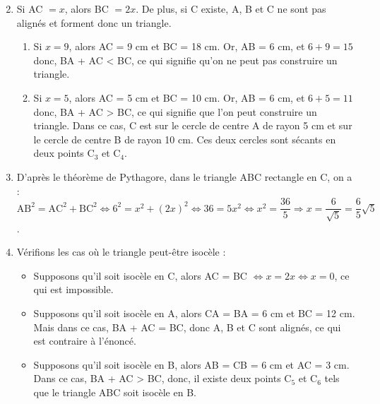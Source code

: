 \begin{enumerate}
\setcounter{enumi}{1}
      \item Si AC $=x$, alors BC $=2x$. De plus, si C existe, A, B et C ne sont pas alignés et forment donc un triangle. \\
      \begin{enumerate}
         \item Si $x=9$, alors AC = 9 cm et BC = 18 cm. Or, AB = 6 cm, et $6+9 =15$ donc, BA + AC < BC, ce qui signifie qu'on ne peut pas construire un triangle. 
         \item Si $x=5$, alors AC = 5 cm et BC = 10 cm. Or, AB = 6 cm, et $6+5 =11$ donc, BA + AC > BC, ce qui signifie que l'on peut construire un triangle. Dans ce cas, C est sur le cercle de centre A de rayon 5 cm et sur le cercle de centre B de rayon 10  cm. Ces deux cercles sont sécants en deux points C$_3$ et C$_4$. \\
      \end{enumerate}
      \item D'après le théorème de Pythagore, dans le triangle ABC rectangle en C, on a : \\
      $\text{AB}^2 =\text{AC}^2+\text{BC}^2 \iff 6^2 =x^2+(2x)^2 \iff 36 =5x^2 \iff x^2 =\dfrac{36}{5} \Longrightarrow x=\dfrac{6}{\sqrt5} =\dfrac{6}{5}\sqrt5$. \\
       \item Vérifions les cas où le triangle peut-être isocèle :
          \begin{itemize}
            \item Supposons qu'il soit isocèle en C, alors AC = BC $\iff x =2x \iff x=0$, ce qui est impossible.
            \item Supposons qu'il soit isocèle en A, alors CA = BA = 6 cm et BC = 12 cm. \\
            Mais dans ce cas, BA + AC = BC, donc A, B et C sont alignés, ce qui est contraire à l'énoncé.
             \item Supposons qu'il soit isocèle en B, alors AB = CB = 6 cm et AC = 3 cm. \\
            Dans ce cas, BA + AC > BC, donc, il existe deux points C$_5$ et C$_6$ tels que le triangle ABC soit isocèle en B.
         \end{itemize}
\end{enumerate}
